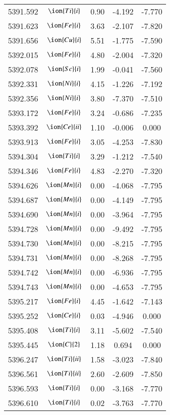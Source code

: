 \documentclass[fleqn,usenatbib]{mnras}
\begin{document}
\begin{center}
\begin{table}
\begin{tabular}{ccccc}
5391.592 &  $\ion{Ti}{i}$  & 0.90 & -4.192 & -7.770 \\ 
5391.623 &  $\ion{Fe}{i}$  & 3.63 & -2.107 & -7.820 \\ 
5391.656 &  $\ion{Cu}{i}$  & 5.51 & -1.775 & -7.590 \\ 
5392.015 &  $\ion{Fe}{i}$  & 4.80 & -2.004 & -7.320 \\ 
5392.078 &  $\ion{Sc}{i}$  & 1.99 & -0.041 & -7.560 \\ 
5392.331 &  $\ion{Ni}{i}$  & 4.15 & -1.226 & -7.192 \\ 
5392.356 &  $\ion{Ni}{i}$  & 3.80 & -7.370 & -7.510 \\ 
5393.172 &  $\ion{Fe}{i}$  & 3.24 & -0.686 & -7.235 \\ 
5393.392 &  $\ion{Ce}{ii}$  & 1.10 & -0.006 & 0.000 \\ 
5393.913 &  $\ion{Fe}{i}$  & 3.05 & -4.253 & -7.830 \\ 
5394.304 &  $\ion{Ti}{i}$  & 3.29 & -1.212 & -7.540 \\ 
5394.346 &  $\ion{Fe}{i}$  & 4.83 & -2.270 & -7.320 \\ 
5394.626 &  $\ion{Mn}{i}$  & 0.00 & -4.068 & -7.795 \\ 
5394.687 &  $\ion{Mn}{i}$  & 0.00 & -4.149 & -7.795 \\ 
5394.690 &  $\ion{Mn}{i}$  & 0.00 & -3.964 & -7.795 \\ 
5394.728 &  $\ion{Mn}{i}$  & 0.00 & -9.492 & -7.795 \\ 
5394.730 &  $\ion{Mn}{i}$  & 0.00 & -8.215 & -7.795 \\ 
5394.731 &  $\ion{Mn}{i}$  & 0.00 & -8.268 & -7.795 \\ 
5394.742 &  $\ion{Mn}{i}$  & 0.00 & -6.936 & -7.795 \\ 
5394.743 &  $\ion{Mn}{i}$  & 0.00 & -4.653 & -7.795 \\ 
5395.217 &  $\ion{Fe}{i}$  & 4.45 & -1.642 & -7.143 \\ 
5395.252 &  $\ion{Ce}{i}$  & 0.03 & -4.946 & 0.000 \\ 
5395.408 &  $\ion{Ti}{i}$  & 3.11 & -5.602 & -7.540 \\ 
5395.445 &  $\ion{C}{2}$ & 1.18 & 0.694 & 0.000 \\ 
5396.247 &  $\ion{Ti}{ii}$  & 1.58 & -3.023 & -7.840 \\ 
5396.561 &  $\ion{Ti}{ii}$  & 2.60 & -2.609 & -7.850 \\ 
5396.593 &  $\ion{Ti}{i}$  & 0.00 & -3.168 & -7.770 \\ 
5396.610 &  $\ion{Ti}{i}$  & 0.02 & -3.763 & -7.770 \\ 

\end{tabular}
\end{table}
\end{center}
\end{document}

